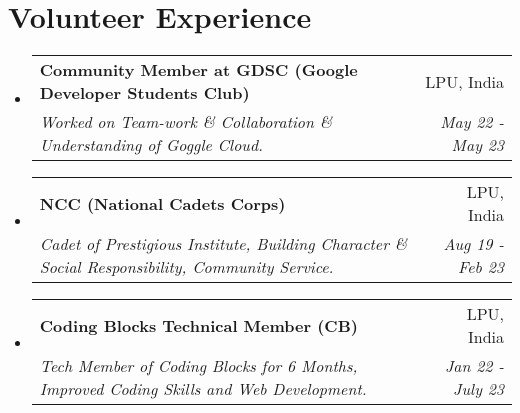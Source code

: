 \documentclass[a4paper,20pt]{article}
\makeatletter
\newcommand{\resumeSubheading}[4]{
  \vspace{-1pt}\item
    \begin{tabular*}{0.97\textwidth}{l@{\extracolsep{\fill}}r}
      \textbf{#1} & #2 \\
      \textit{#3} & \textit{#4} \\
    \end{tabular*}\vspace{-5pt}
}
\newcommand{\resumeSubHeadingListStart}{\begin{itemize}[leftmargin=*]}
\newcommand{\resumeSubHeadingListEnd}{\end{itemize}}
\makeatother
\begin{document}
\vspace{4pt}
\section{Volunteer Experience}
  \resumeSubHeadingListStart
	\resumeSubheading
    {Community Member at GDSC (Google Developer Students Club)}{LPU, India}
    {Worked on Team-work \& Collaboration \& Understanding of Goggle Cloud.}{ May 22 - May 23}
\vspace{5pt}
    \resumeSubheading
    {NCC (National Cadets Corps)}{LPU, India}
    {Cadet of Prestigious Institute, Building Character \& Social Responsibility, Community Service.} { Aug 19 - Feb 23}
\vspace{5pt}

    \resumeSubheading
    {Coding Blocks Technical Member (CB)}{LPU, India}
    {Tech Member of Coding Blocks for 6 Months, Improved Coding Skills and Web Development.} { Jan 22 - July 23}

\resumeSubHeadingListEnd
\end{document}
